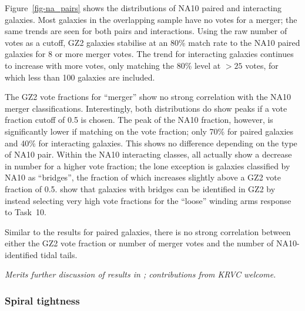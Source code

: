 \documentclass[useAMS,usenatbib]{mn2e}
\begin{document}
Figure~\ref{fig-na_pairs} shows the distributions of NA10 paired and interacting galaxies. Most galaxies in the overlapping sample have no votes for a merger; the same trends are seen for both pairs and interactions. Using the raw number of votes as a cutoff, GZ2 galaxies stabilise at an 80\% match rate to the NA10 paired galaxies for 8 or more merger votes. The trend for interacting galaxies continues to increase with more votes, only matching the 80\% level at $>25$ votes, for which less than 100 galaxies are included.

The GZ2 vote fractions for ``merger'' show no strong correlation with the NA10 merger classifications. Interestingly, both distributions do show peaks if a vote fraction cutoff of 0.5 is chosen. The peak of the NA10 fraction, however, is significantly lower if matching on the vote fraction; only 70\% for paired galaxies and 40\% for interacting galaxies. This shows no difference depending on the type of NA10 pair. Within the NA10 interacting classes, all actually show a decrease in number for a higher vote fraction; the lone exception is galaxies classified by NA10 as ``bridges'', the fraction of which increases slightly above a GZ2 vote fraction of 0.5. \citet{cas13} show that galaxies with bridges can be identified in GZ2 by instead selecting very high vote fractions for the ``loose'' winding arms response to Task~10. 

Similar to the results for paired galaxies, there is no strong correlation between either the GZ2 vote fraction or number of merger votes and the number of NA10-identified tidal tails. 

{\em Merits further discussion of results in \citet{cas13}; contributions from KRVC welcome.}

\subsubsection{Spiral tightness}
\end{document}
